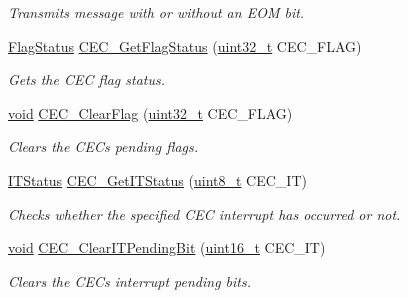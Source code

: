 \begin{DoxyCompactItemize}
\begin{DoxyCompactList}\small\item\em Transmits message with or without an E\+OM bit. \end{DoxyCompactList}\item 
\hyperlink{agilefox_2library_2inc_2stm32f10x__type_8h_a89136caac2e14c55151f527ac02daaff}{Flag\+Status} \hyperlink{group___c_e_c___exported___functions_gaf920706cb350182bf0728c66868053ca}{C\+E\+C\+\_\+\+Get\+Flag\+Status} (\hyperlink{_p_e___types_8h_a33594304e786b158f3fb30289278f5af}{uint32\+\_\+t} C\+E\+C\+\_\+\+F\+L\+AG)
\begin{DoxyCompactList}\small\item\em Gets the C\+EC flag status. \end{DoxyCompactList}\item 
\hyperlink{usb__devapi_8h_afabf60e7f57651d6d595a02c75f07cd0}{void} \hyperlink{group___c_e_c___exported___functions_ga928b373fb5972204c56f9c64113f8c67}{C\+E\+C\+\_\+\+Clear\+Flag} (\hyperlink{_p_e___types_8h_a33594304e786b158f3fb30289278f5af}{uint32\+\_\+t} C\+E\+C\+\_\+\+F\+L\+AG)
\begin{DoxyCompactList}\small\item\em Clears the C\+EC\textquotesingle{}s pending flags. \end{DoxyCompactList}\item 
\hyperlink{agilefox_2library_2inc_2stm32f10x__type_8h_aacbd7ed539db0aacd973a0f6eca34074}{I\+T\+Status} \hyperlink{group___c_e_c___exported___functions_gaa1940a388d0bfcefe7483fb74cc2ba1d}{C\+E\+C\+\_\+\+Get\+I\+T\+Status} (\hyperlink{_p_e___types_8h_aba7bc1797add20fe3efdf37ced1182c5}{uint8\+\_\+t} C\+E\+C\+\_\+\+IT)
\begin{DoxyCompactList}\small\item\em Checks whether the specified C\+EC interrupt has occurred or not. \end{DoxyCompactList}\item 
\hyperlink{usb__devapi_8h_afabf60e7f57651d6d595a02c75f07cd0}{void} \hyperlink{group___c_e_c___exported___functions_gade646921262a077172c708953822f248}{C\+E\+C\+\_\+\+Clear\+I\+T\+Pending\+Bit} (\hyperlink{_p_e___types_8h_a1f1825b69244eb3ad2c7165ddc99c956}{uint16\+\_\+t} C\+E\+C\+\_\+\+IT)
\begin{DoxyCompactList}\small\item\em Clears the C\+EC\textquotesingle{}s interrupt pending bits. \end{DoxyCompactList}\end{DoxyCompactItemize}
